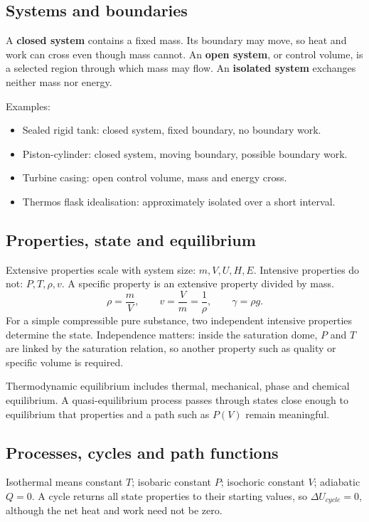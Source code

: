 \documentclass[10pt,a4paper]{article}
\begin{document}
\subsection{Systems and boundaries}
A \textbf{closed system} contains a fixed mass. Its boundary may move, so heat and work can cross even though mass cannot. An \textbf{open system}, or control volume, is a selected region through which mass may flow. An \textbf{isolated system} exchanges neither mass nor energy.

Examples:
\begin{itemize}
\item Sealed rigid tank: closed system, fixed boundary, no boundary work.
\item Piston-cylinder: closed system, moving boundary, possible boundary work.
\item Turbine casing: open control volume, mass and energy cross.
\item Thermos flask idealisation: approximately isolated over a short interval.
\end{itemize}

\subsection{Properties, state and equilibrium}
Extensive properties scale with system size: $m,V,U,H,E$. Intensive properties do not: $P,T,\rho,v$. A specific property is an extensive property divided by mass.
\[
\rho=\frac{m}{V},\qquad v=\frac{V}{m}=\frac1\rho,
\qquad \gamma=\rho g.
\]
For a simple compressible pure substance, two independent intensive properties determine the state. Independence matters: inside the saturation dome, $P$ and $T$ are linked by the saturation relation, so another property such as quality or specific volume is required.

Thermodynamic equilibrium includes thermal, mechanical, phase and chemical equilibrium. A quasi-equilibrium process passes through states close enough to equilibrium that properties and a path such as $P(V)$ remain meaningful.

\subsection{Processes, cycles and path functions}
Isothermal means constant $T$; isobaric constant $P$; isochoric constant $V$; adiabatic $Q=0$. A cycle returns all state properties to their starting values, so $\Delta U_{cycle}=0$, although the net heat and work need not be zero.
\end{document}
